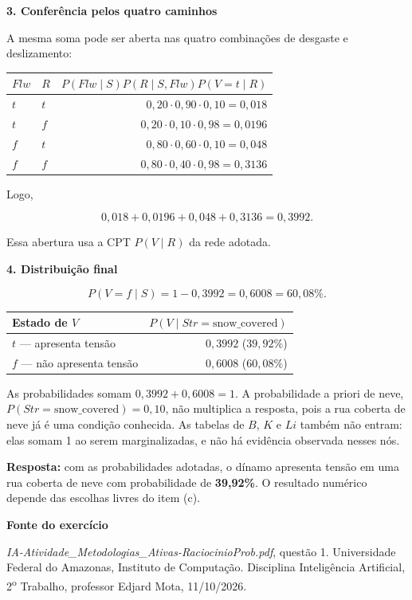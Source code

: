 \documentclass[11pt,a4paper]{article}
\newcommand{\subtitulo}[1]{\par\medskip\textbf{\textcolor{accent}{#1}}\par}
\begin{document}
\clearpage
\subtitulo{3. Conferência pelos quatro caminhos}\label{conferuxeancia-pelos-quatro-caminhos}

A mesma soma pode ser aberta nas quatro combinações de desgaste e deslizamento:

{\def\LTcaptype{none} %
\begin{longtable}[]{@{}llr@{}}
\toprule\noalign{}
\(Flw\) & \(R\) & \(P(Flw\mid S)P(R\mid S,Flw)P(V=t\mid R)\) \\
\midrule\noalign{}
\endhead
\bottomrule\noalign{}
\endlastfoot
\(t\) & \(t\) & \(0{,}20\cdot0{,}90\cdot0{,}10=0{,}018\) \\
\(t\) & \(f\) & \(0{,}20\cdot0{,}10\cdot0{,}98=0{,}0196\) \\
\(f\) & \(t\) & \(0{,}80\cdot0{,}60\cdot0{,}10=0{,}048\) \\
\(f\) & \(f\) & \(0{,}80\cdot0{,}40\cdot0{,}98=0{,}3136\) \\
\end{longtable}
}

Logo,

\[
0{,}018+0{,}0196+0{,}048+0{,}3136=0{,}3992.
\]

Essa abertura usa a CPT \(P(V\mid R)\) da rede adotada.

\subtitulo{4. Distribuição final}\label{distribuiuxe7uxe3o-final}

\[
P(V=f\mid S)=1-0{,}3992=\boxed{0{,}6008=60{,}08\%}.
\]

{\def\LTcaptype{none} %
\begin{longtable}[]{@{}lr@{}}
\toprule\noalign{}
Estado de \(V\) & \(P(V\mid Str=\text{snow\_covered})\) \\
\midrule\noalign{}
\endhead
\bottomrule\noalign{}
\endlastfoot
\(t\) --- apresenta tensão & \(0{,}3992\) (\(39{,}92\%\)) \\
\(f\) --- não apresenta tensão & \(0{,}6008\) (\(60{,}08\%\)) \\
\end{longtable}
}

As probabilidades somam \(0{,}3992+0{,}6008=1\). A probabilidade a priori de neve, \(P(Str=\text{snow\_covered})=0{,}10\), não multiplica a resposta, pois a rua coberta de neve já é uma condição conhecida. As tabelas de \(B\), \(K\) e \(Li\) também não entram: elas somam 1 ao serem marginalizadas, e não há evidência observada nesses nós.

\textbf{Resposta:} com as probabilidades adotadas, o dínamo apresenta tensão em uma rua coberta de neve com probabilidade de \textbf{39,92\%}. O resultado numérico depende das escolhas livres do item (c).


\bigskip
{\small
\textcolor{accent}{\textbf{Fonte do exercício}}\par
\textit{IA-Atividade\_Metodologias\_Ativas-RaciocinioProb.pdf}, questão 1. Universidade Federal do Amazonas, Instituto de Computação. Disciplina Inteligência Artificial, 2\textsuperscript{o} Trabalho, professor Edjard Mota, 11/10/2026.
}
\end{document}
